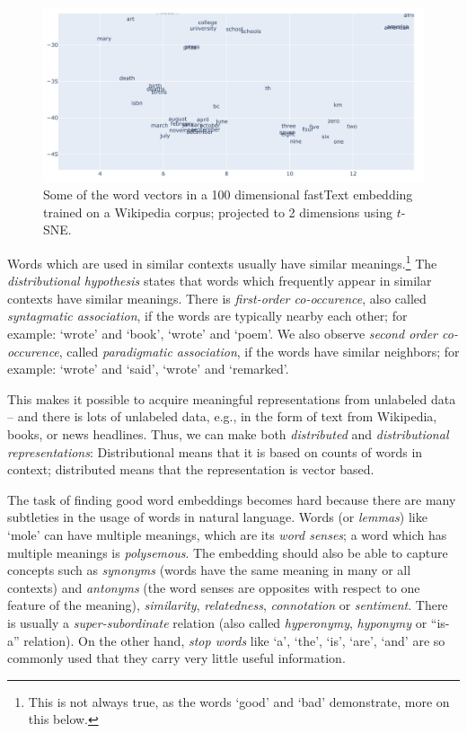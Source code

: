 \documentclass[11pt, a4paper]{amsart}
\begin{document}
\begin{figure}[H]
    \centering
    \includegraphics[width=\linewidth]{figures/fastText_tSNE_screenshot.png}
    \caption{
    	Some of the word vectors in a 100 dimensional fastText embedding trained on a Wikipedia corpus; projected to 2 dimensions using $t$-SNE.
    }
    \label{fig:fastText_tSNE}
\end{figure}

Words which are used in similar contexts usually have similar meanings.\footnote{This is not always true, as the words `good' and `bad' demonstrate, more on this below.}
The \emph{distributional hypothesis} states that words which frequently appear in similar contexts have similar meanings.
There is \emph{first-order co-occurence}, also called \emph{syntagmatic association}, if the words are typically nearby each other; for example: `wrote' and `book', `wrote' and `poem'.
We also observe \emph{second order co-occurence}, called \emph{paradigmatic association}, if the words have similar neighbors; for example: `wrote' and `said', `wrote' and `remarked'.

This makes it possible to acquire meaningful representations from unlabeled data -- and there is lots of unlabeled data, e.g., in the form of text from Wikipedia, books, or news headlines.
Thus, we can make both \emph{distributed} and \emph{distributional representations}:
Distributional means that it is based on counts of words in context;
distributed means that the representation is vector based.

The task of finding good word embeddings becomes hard because there are many subtleties in the usage of words in natural language.
Words (or \emph{lemmas}) like `mole' can have multiple meanings, which are its \emph{word senses}; a word which has multiple meanings is \emph{polysemous}.
The embedding should also be able to capture concepts such as \emph{synonyms} (words have the same meaning in many or all contexts) and \emph{antonyms} (the word senses are opposites with respect to one feature of the meaning), \emph{similarity}, \emph{relatedness}, \emph{connotation} or \emph{sentiment}.
There is usually a \emph{super-subordinate} relation (also called \emph{hyperonymy}, \emph{hyponymy} or ``is-a'' relation).
On the other hand, \emph{stop words} like `a', `the', `is', `are', `and' are so commonly used that they carry very little useful information.
\end{document}
